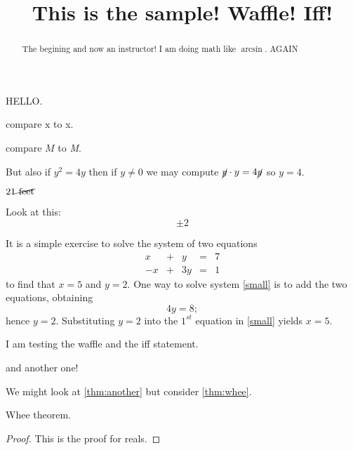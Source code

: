 \documentclass{ximera}
\title[Breal-grond]{This is the sample! Waffle!  Iff!}
\begin{document}
\begin{abstract}
  The begining and now an instructor! I am doing math like $\arcsin$. AGAIN
\end{abstract}

\maketitle

HELLO.


compare $\mathrm{x}$ to x.

compare $M$ to \textit{M}.

But also if $y^2 = 4y$ then if $y \neq 0$ we may compute $\cancel{y} \cdot y = 4 \cancel{y}$ so $y = 4$.

$21 \cancel{\textrm{ feet}}$

Look at this:
\[
  \pm 2
\]








It is a simple exercise to solve the system of two equations
\begin{equation} \label{small}
\begin{array}{rcrcr}
 x & + & y & = & 7 \\
-x & + & 3y & = & 1
\end{array}
\end{equation}
to find that $x=5$ and $y=2$.  One way to solve
system \eqref{small} is to add the two equations, obtaining
\[
4y=8;
\]
hence $y=2$.  Substituting $y=2$ into the $1^{st}$ equation in
\ref{small} yields $x=5$.


I am testing the waffle and the iff statement.



and another one!



We might look at \ref{thm:another} but consider \ref{thm:whee}.

\begin{theorem}
  \label{thm:whee}  Whee theorem.
\end{theorem}
\begin{proof}
This is the proof for reals.
\end{proof}
\end{document}
